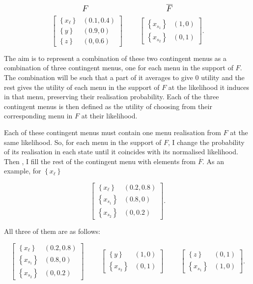 \[
	\text{\large \( F \)} \hspace{4cm} \text{\large \( \overline{F} \)}
\]
\[
	\begin{bmatrix}
		\left\{ x_{\ell} \right\} & \left( 0.1, 0.4 \right) \\
		\left\{ y \right\}        & \left( 0.9, 0 \right)   \\
		\left\{ z \right\}        & \left( 0, 0.6 \right)
	\end{bmatrix}
	\hspace{1cm}
	\begin{bmatrix}
		\left\{ x_{s_1} \right\} & \left( 1, 0 \right) \\
		\left\{ x_{s_2} \right\} & \left( 0, 1 \right)
	\end{bmatrix} .
\]

The aim is to represent a combination of these two contingent menus as a combination of three contingent menus, one for each menu in the support of \( F \). The combination will be such that a part of it averages to give \( 0 \) utility and the rest gives the utility of each menu in the support of \( F \) at the likelihood it induces in that menu, preserving their realisation probability. Each of the three contingent menus is then defined as the utility of choosing from their corresponding menu in \( F \) at their likelihood.

Each of these contingent menus must contain one menu realisation from \( F \) at the same likelihood. So, for each menu in the support of \( F \), I change the probability of its realisation in each state until it coincides with its normalised likelihood. Then , I fill the rest of the contingent menu with elements from \( \overline{F} \). As an example, for \( \left\{ x_{\ell} \right\} \)

\[
	\begin{bmatrix}
		\left\{ x_{\ell} \right\} & \left( 0.2, 0.8 \right) \\
		\left\{ x_{s_1} \right\}  & \left( 0.8, 0 \right)   \\
		\left\{ x_{s_2} \right\}  & \left( 0, 0.2 \right)
	\end{bmatrix} .
\]

All three of them are as follows:

\[
	\begin{bmatrix}
		\left\{ x_{\ell} \right\} & \left( 0.2, 0.8 \right) \\
		\left\{ x_{s_1} \right\}  & \left( 0.8, 0 \right)   \\
		\left\{ x_{s_2} \right\}  & \left( 0, 0.2 \right)
	\end{bmatrix}
	\hspace{1cm}
	\begin{bmatrix}
		\left\{ y \right\}       & \left( 1, 0 \right) \\
		\left\{ x_{s_2} \right\} & \left( 0, 1 \right)
	\end{bmatrix}
	\hspace{1cm}
	\begin{bmatrix}
		\left\{ z \right\}       & \left( 0, 1 \right) \\
		\left\{ x_{s_1} \right\} & \left( 1, 0 \right)
	\end{bmatrix} .
\]

